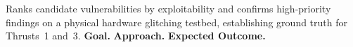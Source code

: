 \subsubsection{\researchtwothree}
Ranks candidate vulnerabilities by exploitability and confirms high-priority findings on a physical hardware glitching testbed, establishing ground truth for Thrusts~1 and~3.
\noindent\textbf{Goal.} %
\noindent\textbf{Approach.} %
\noindent\textbf{Expected Outcome.} %
